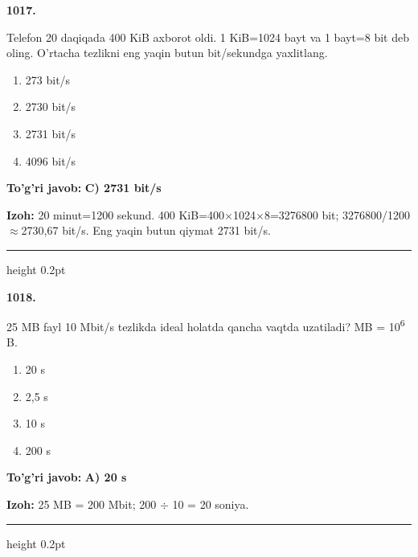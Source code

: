 \documentclass[10pt,a4paper,oneside]{article}
\begin{document}
\noindent\textbf{\color{ink}1017.}
\par
Telefon 20 daqiqada 400 KiB axborot oldi. 1 KiB=1024 bayt va 1 bayt=8 bit deb oling. O'rtacha tezlikni eng yaqin butun bit/sekundga yaxlitlang.
\begin{enumerate}[label=\Alph*),leftmargin=9mm]
\item 273 bit/s
\item 2730 bit/s
\item 2731 bit/s
\item 4096 bit/s
\end{enumerate}
\begin{tcolorbox}[enhanced,breakable,colback=teal!4,colframe=teal!50!black,boxrule=0.5pt,arc=1.1mm,left=3mm,right=3mm,top=1.7mm,bottom=1.7mm,before skip=2mm,after skip=2mm]
\textbf{\color{teal}To'g'ri javob:} \textbf{C) 2731 bit/s}
\par\smallskip
\textbf{Izoh:} 20 minut=1200 sekund. 400 KiB=400\ensuremath{\times}1024\ensuremath{\times}8=3276800 bit; 3276800/1200\ensuremath{\approx}2730,67 bit/s. Eng yaqin butun qiymat 2731 bit/s.
\end{tcolorbox}
\vspace{2mm}\hrule height 0.2pt \vspace{3mm}

\noindent\textbf{\color{ink}1018.}
\par
25 MB fayl 10 Mbit/s tezlikda ideal holatda qancha vaqtda uzatiladi? MB = 10\textsuperscript{6} B.
\begin{enumerate}[label=\Alph*),leftmargin=9mm]
\item 20 s
\item 2,5 s
\item 10 s
\item 200 s
\end{enumerate}
\begin{tcolorbox}[enhanced,breakable,colback=teal!4,colframe=teal!50!black,boxrule=0.5pt,arc=1.1mm,left=3mm,right=3mm,top=1.7mm,bottom=1.7mm,before skip=2mm,after skip=2mm]
\textbf{\color{teal}To'g'ri javob:} \textbf{A) 20 s}
\par\smallskip
\textbf{Izoh:} 25 MB = 200 Mbit; 200 \ensuremath{\div} 10 = 20 soniya.
\end{tcolorbox}
\vspace{2mm}\hrule height 0.2pt \vspace{3mm}
\end{document}
